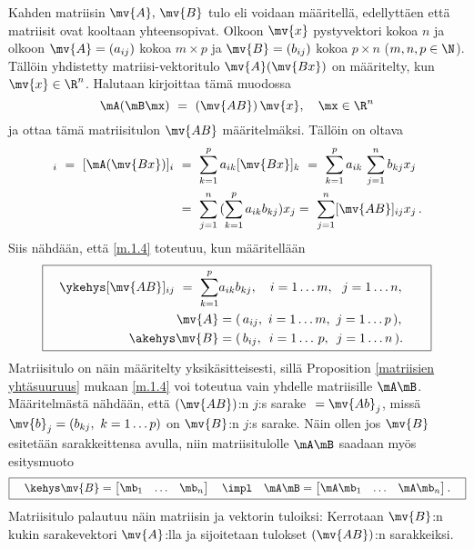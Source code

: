 Kahden matriisin $\mv{A},\,\mv{B}$ tulo eli  voidaan määritellä, edellyttäen
että matriisit ovat kooltaan yhteensopivat. Olkoon $\mv{x}$ pystyvektori kokoa $n$ ja olkoon 
$\mv{A} = (a_{ij})$ kokoa $m \times p$ ja $\mv{B} = (b_{ij})$ kokoa $p \times n$ 
($m,n,p \in \N$). Tällöin yhdistetty matriisi-vektoritulo $\mv{A}(\mv{Bx})$ on määritelty, kun
$\mv{x} \in \R^n$. Halutaan kirjoittaa tämä muodossa
\begin{equation} \label{m.1.4}
\mA(\mB\mx)\ =\ (\mv{AB})\,\mv{x}, \quad \mx\in\R^n
\end{equation}
ja ottaa tämä matriisitulon $\mv{AB}$ määritelmäksi. Tällöin on oltava
\begin{align*}
[\mv{(AB)x}]_i\ =\ [\mA(\mv{Bx})]_i\ &=\ \sum_{k=1}^p a_{ik}[\mv{Bx}]_k\ 
                                      =\ \sum_{k=1}^p a_{ik}\,\sum_{j=1}^n b_{kj} x_j \\
                                     &=\ \sum_{j=1}^n\,( \sum_{k=1}^p a_{ik} b_{kj}) x_j
                                      =\ \sum_{j=1}^n [\mv{AB}]_{ij}x_j\,.
\end{align*}
Siis nähdään, että \eqref{m.1.4} toteutuu, kun määritellään
\[ \boxed{ \begin{aligned}              
    \quad \ykehys [\mv{AB}]_{ij}\ 
         =\ \sum_{k=1}^p &a_{ik} b_{kj}, \quad i = 1 \ldots m,\ \ j = 1 \ldots n, \quad\quad \\
                  \mv{A} &=  (\,a_{ij},\   i = 1 \ldots m,\    j = 1 \ldots p\,), \\
          \akehys \mv{B} &=  (\,b_{ij},\,\ i = 1 \ldots\,p,\,\ j = 1 \ldots n\,). \\
           \end{aligned} } 
\]
%
Matriisitulo on näin määritelty yksikäsitteisesti, sillä Proposition 
\ref{matriisien yhtäsuuruus} mukaan \eqref{m.1.4} voi toteutua vain yhdelle matriisille 
$\mA\mB$. Määritelmästä nähdään, että $(\mv{AB})$:n $j$:s sarake $\ = \mv{Ab}_j$, missä 
$\mv{b}_j=(b_{kj},\ k=1 \ldots p)$ on $\mv{B}$:n $j$:s sarake. Näin ollen jos $\mv{B}$ esitetään
sarakkeittensa avulla, niin matriisitulolle $\mA\mB$ saadaan myös esitysmuoto
\[ 
\boxed{ \quad\kehys \mv{B} 
                 = \begin{bmatrix} \mb_1 & \ldots & \mb_n \end{bmatrix} \quad \impl \quad
          \mA\mB = \begin{bmatrix} \mA\mb_1 & \ldots & \mA\mb_n \end{bmatrix}. \quad } 
\]
Matriisitulo palautuu näin matriisin ja vektorin tuloiksi: Kerrotaan $\mv{B}$:n kukin 
sarakevektori $\mv{A}$:lla ja sijoitetaan tulokset $(\mv{AB})$:n sarakkeiksi. 

